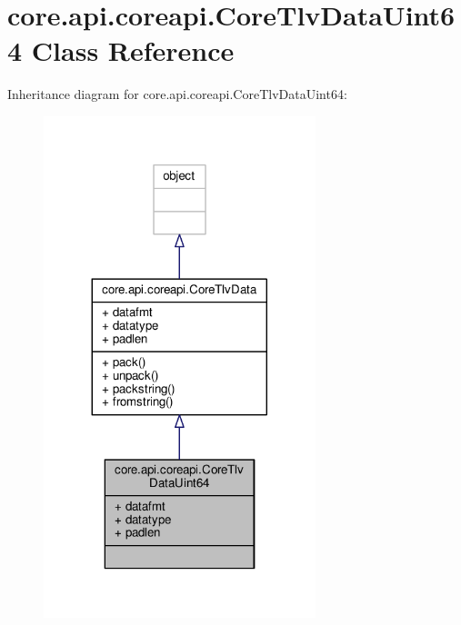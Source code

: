 \hypertarget{classcore_1_1api_1_1coreapi_1_1_core_tlv_data_uint64}{\section{core.\+api.\+coreapi.\+Core\+Tlv\+Data\+Uint64 Class Reference}
\label{classcore_1_1api_1_1coreapi_1_1_core_tlv_data_uint64}
}


Inheritance diagram for core.\+api.\+coreapi.\+Core\+Tlv\+Data\+Uint64\+:
\nopagebreak
\begin{figure}[H]
\begin{center}
\leavevmode
\includegraphics[width=224pt]{classcore_1_1api_1_1coreapi_1_1_core_tlv_data_uint64__inherit__graph}
\end{center}
\end{figure}


